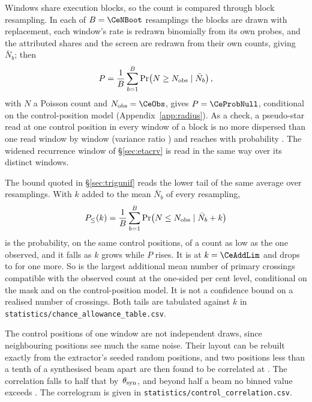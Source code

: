 Windows share execution blocks, so the count is compared through block
resampling. In each of $B=\CeNBoot$ resamplings the blocks are drawn with
replacement, each window's rate is redrawn binomially from its own probes,
and the attributed shares and the screen are redrawn from their own counts,
giving $\bar N_b$; then
\begin{equation*}
P=\frac{1}{B}\sum_{b=1}^{B}\Pr\!\left(N\ge N_{\rm obs}\mid\bar N_b\right),
\end{equation*}
with $N$ a Poisson count and $N_{\rm obs}=\CeObs$, gives $P=\CeProbNull$,
conditional on the control-position model (Appendix~\ref{app:radius}). As
a check, a pseudo-star read at one control position in every window of
a block is no more dispersed than one read window by window (variance ratio
\BgDisp) and reaches \CeObs{} with probability \BgPseudoP. The widened recurrence window
of \S\ref{sec:etacrv} is read in the same way over its \WuNWin{} distinct
windows.

The bound quoted in \S\ref{sec:trigunif} reads the lower tail of the same
average over resamplings. With $k$ added to the mean $\bar N_b$ of every resampling,
\begin{equation*}
P_{\le}(k)=\frac{1}{B}\sum_{b=1}^{B}\Pr\!\left(N\le N_{\rm obs}\mid\bar N_b+k\right)
\end{equation*}
is the probability, on the same control positions, of a count as low as the
one observed, and it falls as $k$ grows while $P$ rises. It is
\CeProbAtLim{} at $k=\CeAddLim$ and drops to \CeProbAboveLim{} for one more.
So \CeAddLim{} is the largest additional mean number of primary crossings
compatible with the observed count at the one-sided \CeAlphaPct{} per cent
level, conditional on the mask and on the control-position model. It is not
a confidence bound on a realised number of crossings. Both tails are
tabulated against $k$ in
\texttt{statistics/\allowbreak chance\_allowance\_table.csv}.

The control positions of one window are not independent draws, since
neighbouring positions see much the same noise. Their layout can be rebuilt
exactly from the extractor's seeded random positions, and two positions
less than a tenth of a synthesised beam apart are then found to be
correlated at \CcRhoNear. The correlation falls to half that by
\CcHalfBeam\,$\theta_{\rm syn}$, and beyond half a beam no binned value
exceeds \CcRhoHalfBeamOut. The correlogram is given in
\texttt{statistics/\allowbreak control\_correlation.csv}.

